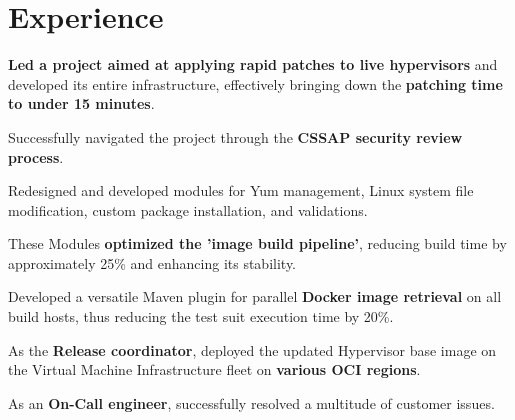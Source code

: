 \documentclass[]{resume-openfont}
\begin{document}
\hfill
\begin{minipage}[t]{0.66\textwidth}


\section{Experience}
\vspace{\topsep} %
\begin{tightemize}
\item \textbf{Led a project aimed at applying rapid patches to live hypervisors} and developed its entire infrastructure, effectively bringing down the \textbf{patching time to under 15 minutes}.
\item Successfully navigated the project through the \textbf{CSSAP security review process}.
\item Redesigned and developed modules for Yum management, Linux system file modification, custom package installation, and validations.
\item These Modules \textbf{optimized the 'image build pipeline'}, reducing build time by approximately 25\% and enhancing its stability.
\item Developed a versatile Maven plugin for parallel \textbf{Docker image retrieval} on all build hosts, thus reducing the test suit execution time by 20\%.
\item As the \textbf{Release coordinator}, deployed the updated Hypervisor base image on the Virtual Machine Infrastructure fleet on \textbf{various OCI regions}.
\item As an \textbf{On-Call engineer}, successfully resolved a multitude of customer issues.
\end{tightemize}
\sectionsep


\end{minipage}
\end{document}
